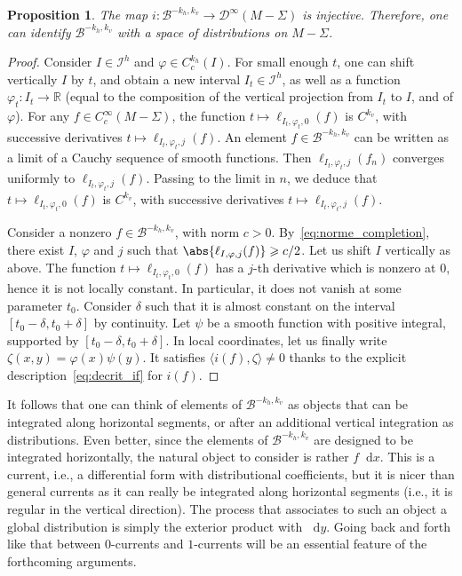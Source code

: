 \documentclass[11pt, a4paper, oneside, final, pagebackref]{amsart}
\newcommand{\boI}{\mathcal{I}}
\newcommand{\boB}{\mathcal{B}}
\newcommand{\boD}{\mathcal{D}}
\newcommand{\R}{\mathbb{R}}
\newcommand{\dd}{\mathop{}\!\mathrm{d}}
\renewcommand{\phi}{\varphi}
\renewcommand{\geq}{\geqslant}
\newtheorem{prop}[thm]{Proposition}
\theoremstyle{definition}
\numberwithin{equation}{section}
\begin{document}
\begin{prop}
\label{prop:distrib} The map $i: \boB^{-k_h, k_v} \to \boD^\infty(M-\Sigma)$
is injective. Therefore, one can identify $\boB^{-k_h, k_v}$ with a space of
distributions on $M-\Sigma$.
\end{prop}
\begin{proof}
Consider $I \in \boI^h$ and $\phi \in C^{k_h}_c(I)$. For small enough $t$,
one can shift vertically $I$ by $t$, and obtain a new interval $I_t \in
\boI^h$, as well as a function $\phi_t:I_t \to \R$ (equal to the composition
of the vertical projection from $I_t$ to $I$, and of $\phi$). For any $f \in
C^\infty_c(M-\Sigma)$, the function $t \mapsto \ell_{I_t, \phi_t, 0}(f)$ is
$C^{k_v}$, with successive derivatives $t \mapsto \ell_{I_t, \phi_t, j}(f)$.
An element $f \in \boB^{-k_h, k_v}$ can be written as a limit of a Cauchy
sequence of smooth functions. Then $\ell_{I_t, \phi_t, j}(f_n)$ converges
uniformly to $\ell_{I_t, \phi_t, j}(f)$. Passing to the limit in $n$, we
deduce that $t \mapsto \ell_{I_t, \phi_t, 0}(f)$ is $C^{k_v}$, with
successive derivatives $t \mapsto \ell_{I_t, \phi_t, j}(f)$.

Consider a nonzero $f \in \boB^{-k_h, k_v}$, with norm $c>0$.
By~\eqref{eq:norme_completion}, there exist $I$, $\phi$ and $j$ such that
$\abs{\ell_{I,\phi,j}(f)} \geq c/2$. Let us shift $I$ vertically as above.
The function $t \mapsto \ell_{I_t, \phi_t, 0}(f)$ has a $j$-th derivative
which is nonzero at $0$, hence it is not locally constant. In particular, it
does not vanish at some parameter $t_0$. Consider $\delta$ such that it is
almost constant on the interval $[t_0-\delta, t_0+\delta]$ by continuity. Let
$\psi$ be a smooth function with positive integral, supported by
$[t_0-\delta, t_0+\delta]$. In local coordinates, let us finally write
$\zeta(x,y)= \phi(x) \psi(y)$. It satisfies $\langle i(f), \zeta \rangle \neq
0$ thanks to the explicit description~\eqref{eq:decrit_if} for $i(f)$.
\end{proof}

It follows that one can think of elements of $\boB^{-k_h, k_v}$ as objects
that can be integrated along horizontal segments, or after an additional
vertical integration as distributions. Even better, since the elements of
$\boB^{-k_h, k_v}$ are designed to be integrated horizontally, the natural
object to consider is rather $f\dd x$. This is a current, i.e., a
differential form with distributional coefficients, but it is nicer than
general currents as it can really be integrated along horizontal segments
(i.e., it is regular in the vertical direction). The process that associates
to such an object a global distribution is simply the exterior product with
$\dd y$. Going back and forth like that between $0$-currents and $1$-currents
will be an essential feature of the forthcoming arguments.
\end{document}
